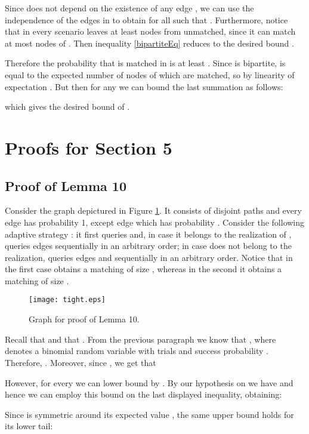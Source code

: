 \documentclass[12pt]{article}
\newcommand{\tightSampling}[0]{10}
\begin{document}
			
			Since  does not depend on the existence of any edge , we can use the independence of the edges in  to obtain  for all  such that . Furthermore, notice that in every scenario  leaves at least  nodes from  unmatched, since it can match at most  nodes of . Then inequality \eqref{bipartiteEq} reduces to the desired bound . 
			
			Therefore the probability that  is matched in  is at least . Since  is bipartite,  is equal to the expected number of nodes of  which are matched, so by linearity of expectation . But then for any  we can bound the last summation as follows:

		which gives the desired bound of .	


\section{Proofs for Section 5}

	\subsection{Proof of Lemma \tightSampling}
			
		Consider the graph  depictured in Figure \ref{fig:tightSampling}. It consists of  disjoint paths and every edge has probability 1, except edge  which has probability . Consider the following adaptive strategy : it first queries  and, in case it belongs to the realization of ,  queries edges  sequentially in an arbitrary order; in case  does not belong to the realization,  queries edges   and  sequentially in an arbitrary order. Notice that in the first case  obtains a matching of size , whereas in the second it obtains a matching of size . 

\begin{figure}[htbp]
	\centering
		\texttt{[image: tight.eps]}
	\caption{Graph for proof of Lemma \tightSampling.}
	\label{fig:tightSampling}
\end{figure}
			
		Recall that  and that . From the previous paragraph we know that , where  denotes a binomial random variable with  trials and success probability . Therefore, . Moreover, since , we get that

		However, for every  we can lower bound  by  \cite{matousekVondrak}. By our hypothesis on  we have  and hence we can employ this bound on the last displayed inequality, obtaining:

		
		Since  is symmetric around its expected value , the same upper bound holds for its lower tail:
\end{document}
